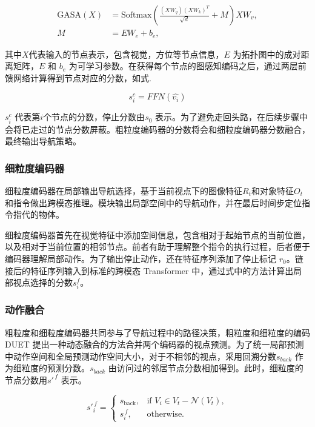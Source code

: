 \documentclass[bachelor]{thesis-uestc}
\begin{document}
\begin{equation}
    \begin{aligned}
        \text{GASA}(X) &= \text{Softmax} \left( \frac{(XW_{q})(XW_{k})^{T}}{\sqrt{d}} + M \right) XW_{v}, \\
        M &= EW_{e} + b_{e},
    \end{aligned}
\label{GASA}
\end{equation}

其中$X$代表输入的节点表示，包含视觉，方位等节点信息，$E$ 为拓扑图中的成对距离矩阵，$E$ 和 $b_{e}$ 为可学习参数。在获得每个节点的图感知编码之后，通过两层前馈网络计算得到节点对应的分数，如式.

\begin{equation}
    s^c_i = FFN(\hat{v_i})
\label{}
\end{equation}

$s^c_i $ 代表第$i$个节点的分数，停止分数由$s_0$ 表示。为了避免走回头路，在后续步骤中会将已走过的节点分数屏蔽。粗粒度编码器的分数将会和细粒度编码器分数融合，最终输出导航策略。

\subsubsection{细粒度编码器}

细粒度编码器在局部输出导航选择，基于当前视点下的图像特征$R_t$和对象特征$O_t$ 和指令做出跨模态推理。模块输出局部空间中的导航动作，并在最后时间步定位指令指代的物体。

细粒度编码器首先在视觉特征中添加空间信息，包含相对于起始节点的当前位置，以及相对于当前位置的相邻节点。前者有助于理解整个指令的执行过程，后者便于编码器理解局部动作。为了输出停止动作，还在特征序列添加了停止标记 $r_0$。链接后的特征序列输入到标准的跨模态 Transformer 中，通过式中的方法计算出局部视点选择的分数$s^f_i$。

\subsubsection{动作融合}

粗粒度和细粒度编码器共同参与了导航过程中的路径决策，粗粒度和细粒度的编码DUET 提出一种动态融合的方法合并两个编码器的视点预测。为了统一局部预测中动作空间和全局预测动作空间大小，对于不相邻的视点，采用回溯分数$s_{back}$ 作为细粒度的预测分数。$s_{back}$ 由访问过的邻居节点分数相加得到。此时，细粒度的节点分数用$s'^{\,f}$ 表示。

\begin{equation}
    s'^{\,f}_{i} = 
\begin{cases} 
s_{\text{back}}, & \text{if } V_{i} \in V_{t} - \mathcal{N}(V_{t}), \\
s^{\,f}_{i}, & \text{otherwise}.
\end{cases}
\label{fusion}
\end{equation}
\end{document}
